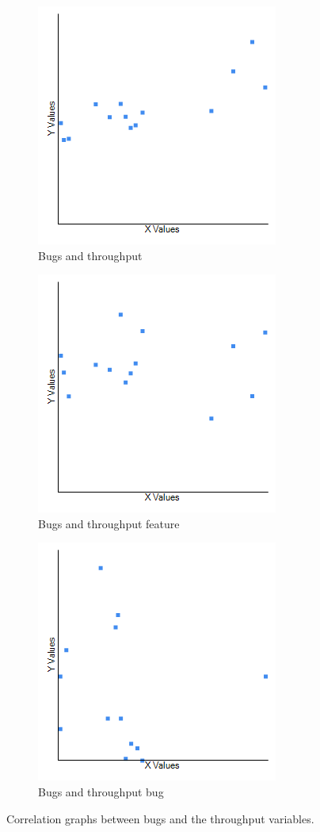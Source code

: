 \documentclass[UKenglish]{ifimaster}  %
\begin{document}
\begin{figure}[h] 
  \begin{subfigure}[b]{0.3\textwidth}
\includegraphics[scale=0.5]{Picture/Two/BugVSTP.png}
 \caption{Bugs and throughput} 
 \label{fig:a:2}
  \end{subfigure}
  \begin{subfigure}[b]{0.3\textwidth}
\includegraphics[scale=0.5]{Picture/Two/BugVSTPFT.png}
 \caption{Bugs and throughput feature} 
\label{fig:b:2}
  \end{subfigure}
  \begin{subfigure}[b]{0.3\textwidth}
\includegraphics[scale=0.5]{Picture/Eight/LTvsChurnB.png}
 \caption{Bugs and throughput bug} 
\label{fig:c:2}
  \end{subfigure}
\caption{Correlation graphs between bugs and the throughput variables.}
\label{corr:Difference:2}
\end{figure}
\end{document}
